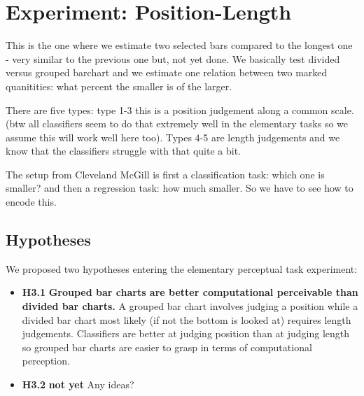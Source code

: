 \section{Experiment: Position-Length}

This is the one where we estimate two selected bars compared to the longest one - very similar to the previous one but, not yet done. We basically test divided versus grouped barchart and we estimate one relation between two marked quanitities: what percent the smaller is of the larger.

There are five types: type 1-3 this is a position judgement along a common scale. (btw all classifiers seem to do that extremely well in the elementary tasks so we assume this will work well here too). Types 4-5 are length judgements and we know that the classifiers struggle with that quite a bit.

The setup from Cleveland McGill is first a classification task: which one is smaller? and then a regression task: how much smaller. So we have to see how to encode this.


\subsection{Hypotheses}

We proposed two hypotheses entering the elementary perceptual task experiment:

\begin{itemize}
	\item \textbf{H3.1} \textbf{Grouped bar charts are better computational perceivable than divided bar charts.} A grouped bar chart involves judging a position while a divided bar chart most likely (if not the bottom is looked at) requires length judgements. Classifiers are better at judging position than at judging length so grouped bar charts are easier to grasp in terms of computational perception.
	\item \textbf{H3.2} \textbf{not yet} Any ideas?
\end{itemize}


